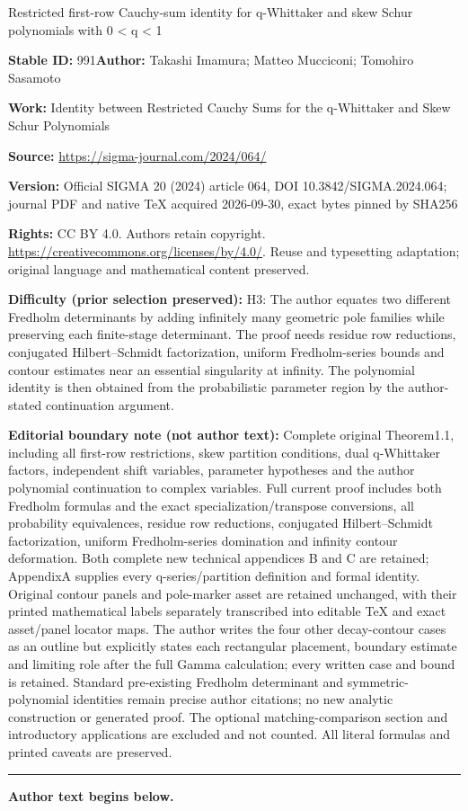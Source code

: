 \documentclass[11pt]{article}
\numberwithin{equation}{section}
\numberwithin{equation}{section}
\begin{document}
\begin{center}\Large Restricted first-row Cauchy-sum identity for q-Whittaker and skew Schur polynomials with 0 < q < 1\end{center}
\noindent\textbf{Stable ID:} 991\quad\textbf{Author:} Takashi Imamura; Matteo Mucciconi; Tomohiro Sasamoto\par
\noindent\textbf{Work:} Identity between Restricted Cauchy Sums for the q-Whittaker and Skew Schur Polynomials\par
\noindent\textbf{Source:} \url{https://sigma-journal.com/2024/064/}\par
\noindent\textbf{Version:} Official SIGMA 20 (2024) article 064, DOI 10.3842/SIGMA.2024.064; journal PDF and native TeX acquired 2026-09-30, exact bytes pinned by SHA256\par
\noindent\textbf{Rights:} CC BY 4.0. Authors retain copyright. \url{https://creativecommons.org/licenses/by/4.0/}. Reuse and typesetting adaptation; original language and mathematical content preserved.\par
\noindent\textbf{Difficulty (prior selection preserved):} {\CJKfont H3: The author equates two different Fredholm determinants by adding infinitely many geometric pole families while preserving each finite-stage determinant. The proof needs residue row reductions, conjugated Hilbert–Schmidt factorization, uniform Fredholm-series bounds and contour estimates near an essential singularity at infinity. The polynomial identity is then obtained from the probabilistic parameter region by the author-stated continuation argument.}\par
\medskip\noindent\textbf{Editorial boundary note (not author text):} Complete original Theorem1.1, including all first-row restrictions, skew partition conditions, dual q-Whittaker factors, independent shift variables, parameter hypotheses and the author polynomial continuation to complex variables. Full current proof includes both Fredholm formulas and the exact specialization/transpose conversions, all probability equivalences, residue row reductions, conjugated Hilbert–Schmidt factorization, uniform Fredholm-series domination and infinity contour deformation. Both complete new technical appendices B and C are retained; AppendixA supplies every q-series/partition definition and formal identity. Original contour panels and pole-marker asset are retained unchanged, with their printed mathematical labels separately transcribed into editable TeX and exact asset/panel locator maps. The author writes the four other decay-contour cases as an outline but explicitly states each rectangular placement, boundary estimate and limiting role after the full Gamma calculation; every written case and bound is retained. Standard pre-existing Fredholm determinant and symmetric-polynomial identities remain precise author citations; no new analytic construction or generated proof. The optional matching-comparison section and introductory applications are excluded and not counted. All literal formulas and printed caveats are preserved.\par
\medskip\hrule\medskip\noindent\textbf{Author text begins below.}\par
\end{document}
